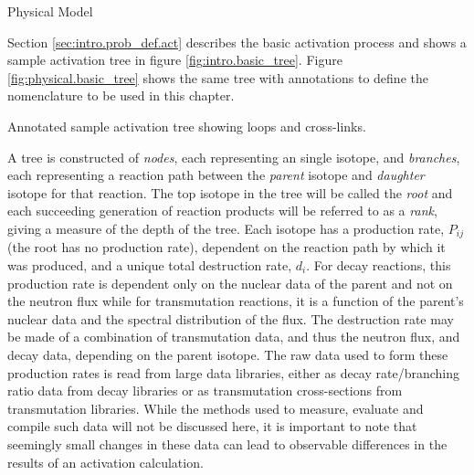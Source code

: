 \begin{chapter}{Physical Model\label{chap:physical}}

Section \ref{sec:intro.prob_def.act} describes the basic activation
process and shows a sample activation tree in figure
\ref{fig:intro.basic_tree}.  Figure \ref{fig:physical.basic_tree} shows
the same tree with annotations to define the nomenclature to be used
in this chapter.

\begin{floatingfigure}{0.55\columnwidth}
  \begin{center}
    \caption{Annotated sample activation tree showing loops and
      cross-links.}\label{fig:physical.basic_tree}
  \end{center}
\end{floatingfigure}

A tree is constructed of \textsl{nodes}, each representing an single
isotope, and \textsl{branches}, each representing a reaction path
between the \textsl{parent} isotope and \textsl{daughter} isotope for
that reaction.  The top isotope in the tree will be called the
\textsl{root} and each succeeding generation of reaction products will
be referred to as a \textsl{rank}, giving a measure of the depth of
the tree.  Each isotope has a production rate, $P_{ij}$ (the root has
no production rate), dependent on the reaction path by which it was
produced, and a unique total destruction rate, $d_i$.  For decay
reactions, this production rate is dependent only on the nuclear data
of the parent and not on the neutron flux while for transmutation
reactions, it is a function of the parent's nuclear data and the
spectral distribution of the flux.  The destruction rate may be made
of a combination of transmutation data, and thus the neutron flux, and
decay data, depending on the parent isotope.  The raw data used to
form these production rates is read from large data libraries, either
as decay rate/branching ratio data from decay libraries or as
transmutation cross-sections from transmutation libraries.  While the
methods used to measure, evaluate and compile such
data\cite{EAF,FENDL2} will not be discussed here, it is important to
note that seemingly small changes in these data can lead to observable
differences in the results of an activation calculation.


\end{chapter}
